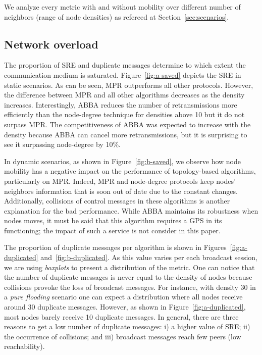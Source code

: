 %
We analyze every metric with and without mobility over different number of neighbors (range of node densities) as refereed at Section~\ref{sec:scenarios}.
%
\subsection{Network overload}

The proportion of SRE and duplicate messages determine to which extent the communication medium is saturated.
%
Figure~\ref{fig:a-saved} depicts the SRE in static scenarios.
%
As can be seen, MPR outperforms all other protocols.
%
However, the difference between MPR and all other algorithms decreases as the density increases.
%
Interestingly, ABBA reduces the number of retransmissions more efficiently than the node-degree technique for densities above 10 but it do not surpass MPR. 
%
The competitiveness of ABBA was expected to increase with the density because ABBA can cancel more retransmissions, but it is surprising to see it surpassing node-degree by 10\%.
%

In dynamic scenarios, as shown in Figure~\ref{fig:b-saved}, we observe how node mobility has a negative impact on the performance of topology-based algorithms, particularly on MPR.
%
Indeed, MPR and node-degree protocols keep nodes' neighbors information that is soon out of date due to the constant changes. 
%
Additionally, collisions of control messages in these algorithms is another explanation for the bad performance.
%
While ABBA maintains its robustness when nodes moves, it must be said that this algorithm requires a GPS in its functioning; the impact of such a service is not consider in this paper.
%

The proportion of duplicate messages per algorithm is shown in Figures~\ref{fig:a-duplicated} and~\ref{fig:b-duplicated}.
%
As this value varies per each broadcast session, we are using \textit{boxplots} to present a distribution of the metric.
%
One can notice that the number of duplicate messages is never equal to the density of nodes because collisions provoke the loss of broadcast messages.
%
For instance, with density 30 in a \textit{pure flooding} scenario one can expect a distribution where all nodes receive around 30 duplicate messages.
%
However, as shown in Figure~\ref{fig:a-duplicated}, most nodes barely receive 10 duplicate messages.
%
In general, there are three reasons to get a low number of duplicate messages: i) a higher value of SRE; ii) the occurrence of collisions; and iii) broadcast messages reach few peers (low reachability).


